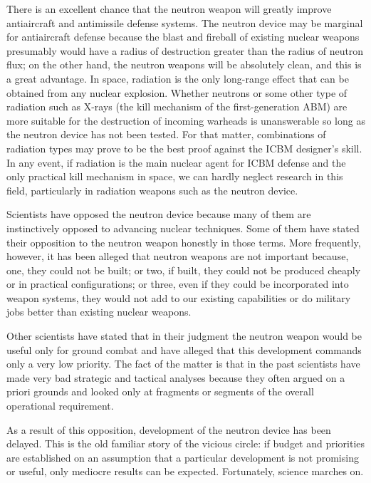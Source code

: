 There is an excellent chance that the neutron weapon will greatly improve antiaircraft and antimissile defense systems. The neutron device may be marginal for antiaircraft defense because the blast and fireball of existing nuclear weapons presumably would have a radius of destruction greater than the radius of neutron flux; on the other hand, the neutron weapons will be absolutely clean, and this is a great advantage. In space, radiation is the only long-range effect that can be obtained from any nuclear explosion. Whether neutrons or some other type of radiation such as X-rays (the kill mechanism of the first-generation ABM) are more suitable for the destruction of incoming warheads is unanswerable so long as the neutron device has not been tested. For that matter, combinations of radiation types may prove to be the best proof against the ICBM designer's skill. In any event, if radiation is the main nuclear agent for ICBM defense and the only practical kill mechanism in space, we can hardly neglect research in this field, particularly in radiation weapons such as the neutron device.

Scientists have opposed the neutron device because many of them are instinctively opposed to advancing nuclear techniques. Some of them have stated their opposition to the neutron weapon honestly in those terms. More frequently, however, it has been alleged that neutron weapons are not important because, one, they could not be built; or two, if built, they could not be produced cheaply or in practical configurations; or three, even if they could be incorporated into weapon systems, they would not add to our existing capabilities or do military jobs better than existing nuclear weapons.

Other scientists have stated that in their judgment the neutron weapon would be useful only for ground combat and have alleged that this development commands only a very low priority. The fact of the matter is that in the past scientists have made very bad strategic and tactical analyses because they often argued on a priori grounds and looked only at fragments or segments of the overall operational requirement.

As a result of this opposition, development of the neutron device has been delayed. This is the old familiar story of the vicious circle: if budget and priorities are established on an assumption that a particular development is not promising or useful, only mediocre results can be expected. Fortunately, science marches on.

